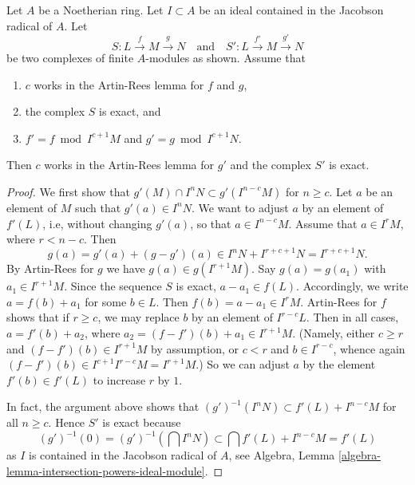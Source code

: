 \begin{lemma}
\label{lemma-approximate-complex}
Let $A$ be a Noetherian ring. Let $I \subset A$ be an ideal contained in
the Jacobson radical of $A$. Let
$$
S : L \xrightarrow{f} M \xrightarrow{g} N
\quad\text{and}\quad
S' : L \xrightarrow{f'} M \xrightarrow{g'} N
$$
be two complexes of finite $A$-modules as shown. Assume that
\begin{enumerate}
\item $c$ works in the Artin-Rees lemma for $f$ and $g$,
\item the complex $S$ is exact, and
\item $f' = f \bmod I^{c + 1}M$ and $g' = g \bmod I^{c + 1}N$.
\end{enumerate}
Then $c$ works in the Artin-Rees lemma for $g'$ and the
complex $S'$ is exact.
\end{lemma}

\begin{proof}
We first show that $g'(M) \cap I^nN \subset g'(I^{n - c}M)$ for $n \geq c$.
Let $a$ be an element of $M$ such that $g'(a) \in I^nN$. We want to
adjust $a$ by an element of $f'(L)$, i.e, without changing $g'(a)$, so
that $a \in I^{n-c}M$. Assume that $a \in I^rM$, where $r < n - c$.
Then
$$
g(a) = g'(a) + (g - g')(a) \in
I^n N + I^{r + c + 1}N = I^{r + c + 1}N.
$$
By Artin-Rees for $g$ we have $g(a) \in g(I^{r + 1}M)$. Say $g(a) = g(a_1)$
with $a_1 \in I^{r + 1}M$. Since the sequence $S$ is exact, $a - a_1 \in f(L)$.
Accordingly, we write $a = f(b) + a_1$ for some $b \in L$.
Then $f(b) = a - a_1 \in I^rM$. Artin-Rees for $f$ shows that
if $r \geq c$, we may replace $b$ by an element of $I^{r - c}L$.
Then in all cases, $a = f'(b) + a_2$, where
$a_2 = (f - f')(b) + a_1 \in I^{r + 1}M$. (Namely, either $c \geq r$
and $(f - f')(b) \in I^{r + 1}M$ by assumption, or $c < r$ and
$b \in I^{r - c}$, whence again $(f - f')(b) \in I^{c + 1} I^{r - c} M =
I^{r + 1}M$.) So we can adjust $a$ by the element $f'(b) \in f'(L)$ to
increase $r$ by $1$.

\medskip\noindent
In fact, the argument above shows that
$(g')^{-1}(I^nN) \subset f'(L) + I^{n - c}M$ for all $n \geq c$.
Hence $S'$ is exact because
$$
(g')^{-1}(0) = (g')^{-1}(\bigcap I^nN) \subset
\bigcap f'(L) + I^{n - c}M = f'(L)
$$
as $I$ is contained in the Jacobson radical of $A$, see Algebra, Lemma
\ref{algebra-lemma-intersection-powers-ideal-module}.
\end{proof}